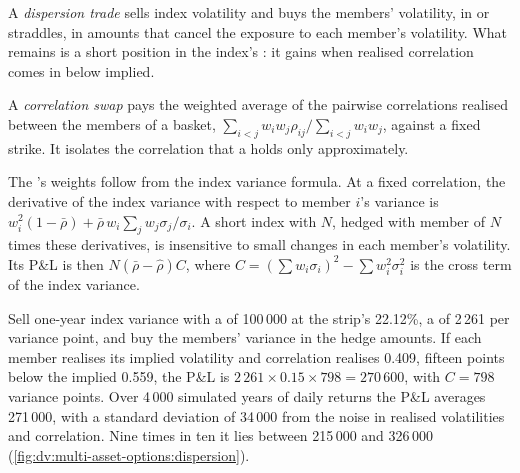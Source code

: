 \begin{definition}\label{def:dv:multi-asset-options:dispersion}
A \emph{dispersion trade} sells index volatility and buys the members' volatility, in  or straddles, in amounts that cancel the exposure to each member's volatility. What remains is a short position in
the index's : it gains when realised correlation comes in below implied.
\end{definition}

\begin{definition}\label{def:dv:multi-asset-options:corrswap}
A \emph{correlation swap} pays the weighted average of the pairwise correlations realised
between the members of a basket, $\sum_{i<j}w_iw_j\hat\rho_{ij}/\sum_{i<j}w_iw_j$, against a fixed strike. It isolates the
correlation that a  holds only approximately.
\end{definition}

The 's weights follow from the index variance formula. At a fixed correlation, the derivative of the
index variance with respect to member $i$'s variance is
$w_i^2(1-\bar\rho)+\bar\rho\,w_i\sum_jw_j\sigma_j/\sigma_i$. A short index  with  $N$,
hedged with member  of $N$ times these derivatives, is insensitive to small changes in each member's
volatility. Its P\&L is then $N(\bar\rho-\hat\rho)C$, where $C=(\sum w_i\sigma_i)^2-\sum w_i^2\sigma_i^2$ is the
cross term of the index variance.

\begin{example}\label{ex:dv:multi-asset-options:dispersion}
Sell one-year index variance with a  of 100\,000 at the strip's 22.12\%, a  of 2\,261 per
variance point, and buy the members' variance in the hedge amounts. If each member realises its implied volatility and
correlation realises 0.409, fifteen points below the implied 0.559, the P\&L is
$2\,261\times0.15\times798=270\,600$, with $C=798$ variance points. Over 4\,000 simulated years of daily returns the
P\&L averages 271\,000, with a standard deviation of 34\,000 from the noise in realised volatilities and correlation. Nine
times in ten it lies between 215\,000 and 326\,000 (\cref{fig:dv:multi-asset-options:dispersion}).
\end{example}

